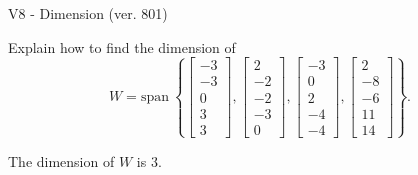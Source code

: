 \begin{exercise}
  \begin{exerciseTitle}V8 - Dimension (ver. 801)\end{exerciseTitle}
  \begin{exerciseStatement}
    Explain how to find the dimension of 
\[W=\mathrm{span}\ \left\{\left[\begin{array}{r}
-3 \\
-3 \\
0 \\
3 \\
3
\end{array}\right] , \left[\begin{array}{r}
2 \\
-2 \\
-2 \\
-3 \\
0
\end{array}\right] , \left[\begin{array}{r}
-3 \\
0 \\
2 \\
-4 \\
-4
\end{array}\right] , \left[\begin{array}{r}
2 \\
-8 \\
-6 \\
11 \\
14
\end{array}\right]\right\}.\]



  \end{exerciseStatement}
  \begin{exerciseAnswer}
   The dimension of \(W\) is  \(3\).
  


  \end{exerciseAnswer}
\end{exercise}
